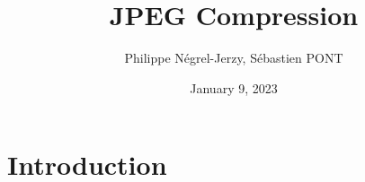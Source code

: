 \documentclass{sebaClass}
\title{JPEG Compression}
\author{Philippe Négrel-Jerzy, Sébastien PONT}
\date{January 9, 2023}
\begin{document}
\maketitle
\tableofcontents

\newpage

\section{Introduction}


% 

% 

% 
\end{document}
